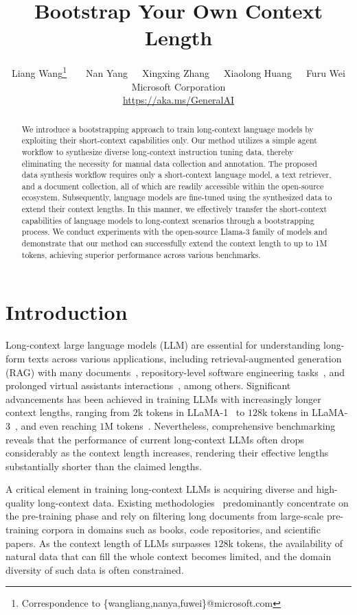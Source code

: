 \documentclass{article}
\title{Bootstrap Your Own Context Length}
\author{Liang Wang\thanks{Correspondence to \{wangliang,nanya,fuwei\}@microsoft.com}~~~~Nan Yang~~~Xingxing Zhang~~~Xiaolong Huang~~~Furu Wei\\
Microsoft Corporation \\
{\href{https://aka.ms/GeneralAI}{https://aka.ms/GeneralAI}}
}
\begin{document}
\maketitle


\begin{abstract}

We introduce a bootstrapping approach to train long-context language models
by exploiting their short-context capabilities only.
Our method utilizes a simple agent workflow to synthesize diverse long-context instruction tuning data,
thereby eliminating the necessity for manual data collection and annotation.
The proposed data synthesis workflow requires only a short-context language model,
a text retriever, and a document collection,
all of which are readily accessible within the open-source ecosystem.
Subsequently,
language models are fine-tuned using the synthesized data to extend their context lengths.
In this manner,
we effectively transfer the short-context capabilities of language models to long-context scenarios
through a bootstrapping process.
We conduct experiments with the open-source Llama-3 family of models
and demonstrate that our method can successfully extend the context length to up to 1M tokens,
achieving superior performance across various benchmarks.
\end{abstract}

\section{Introduction}
Long-context large language models (LLM) are essential for understanding long-form texts
across various applications,
including retrieval-augmented generation (RAG) with many documents~\citep{lewis2020retrieval,jiang2024longrag},
repository-level software engineering tasks~\citep{jimenezswe},
and prolonged virtual assistants interactions~\citep{park2023generative}, among others.
Significant advancements has been achieved in training LLMs with increasingly longer context lengths,
ranging from $2$k tokens in LLaMA-1~\citep{touvron2023llama} to $128$k tokens in LLaMA-3~\citep{dubey2024llama},
and even reaching $1$M tokens~\citep{liu2024world,gradientlongcontextllama3}.
Nevertheless,
comprehensive benchmarking~\citep{hsieh2024ruler} reveals that
the performance of current long-context LLMs often drops considerably as the context length increases,
rendering their effective lengths substantially shorter than the claimed lengths.

A critical element in training long-context LLMs is acquiring diverse and high-quality long-context data.
Existing methodologies~\citep{fu2024data,dubey2024llama,pengyarn}
predominantly concentrate on the pre-training phase and rely on filtering long documents from large-scale pre-training corpora
in domains such as books, code repositories, and scientific papers.
As the context length of LLMs surpasses $128$k tokens,
the availability of natural data that can fill the whole context becomes limited,
and the domain diversity of such data is often constrained.
\end{document}
